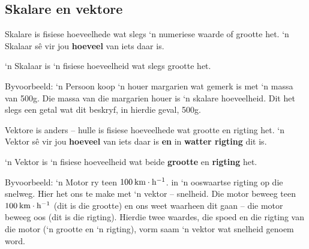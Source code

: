 \subsection*{Skalare en vektore}
            \nopagebreak

Skalare is fisiese hoeveelhede wat slegs ‘n numeriese waarde of grootte het. ‘n Skalaar s\^{e} vir jou \textbf{hoeveel} van iets daar is.  

 {‘n Skalaar is ‘n fisiese hoeveelheid wat slegs grootte het.} 

Byvoorbeeld: ‘n Persoon koop ‘n houer margarien wat gemerk is met ‘n massa van 500g. Die massa van die margarien houer is ‘n skalare hoeveelheid. Dit het slegs een getal wat dit beskryf, in hierdie geval, 500g. 

Vektore is anders – hulle is fisiese hoeveelhede wat grootte en rigting het. ‘n Vektor sê vir jou \textbf{hoeveel} van iets daar is \textbf{en} in \textbf{watter rigting} dit is.

 {‘n Vektor is ‘n fisiese hoeveelheid wat beide \textbf{grootte} en \textbf{rigting} het.}



 

Byvoorbeeld: ‘n Motor ry teen $100\phantom{\rule{2pt}{0ex}}\text{km}\ensuremath{\cdot}\text{h}{}^{-1}$. in ‘n ooswaartse rigting op die snelweg. Hier het ons te make met ‘n vektor – snelheid. Die motor beweeg teen $100\phantom{\rule{2pt}{0ex}}\text{km}\ensuremath{\cdot}\text{h}{}^{-1}$ (dit is die grootte) en ons weet waarheen dit gaan – die motor beweeg oos (dit is die rigting). Hierdie twee waardes, die spoed en die rigting van die motor (‘n grootte en ‘n rigting), vorm saam ‘n vektor wat snelheid genoem word.

